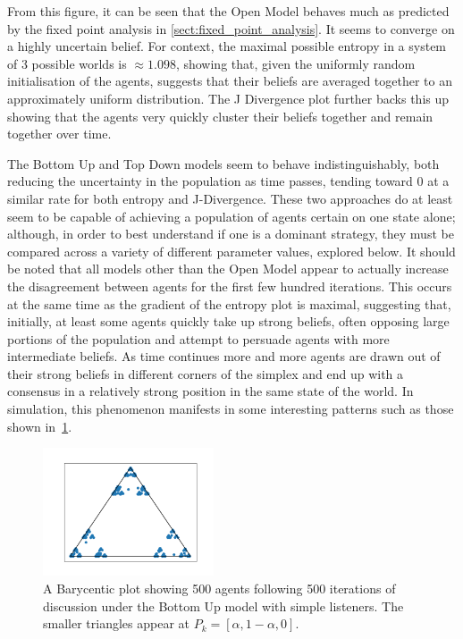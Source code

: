 From this figure, it can be seen that the Open Model behaves much as predicted by the fixed point analysis in \cref{sect:fixed_point_analysis}. It seems to converge on a highly uncertain belief. For context, the maximal possible entropy in a system of $3$ possible worlds is $\approx 1.098$, showing that, given the uniformly random initialisation of the agents, suggests that their beliefs are averaged together to an approximately uniform distribution. The J Divergence plot further backs this up showing that the agents very quickly cluster their beliefs together and remain together over time. 

The Bottom Up and Top Down models seem to behave indistinguishably, both reducing the uncertainty in the population as time passes, tending toward $0$ at a similar rate for both entropy and J-Divergence. These two approaches do at least seem to be capable of achieving a population of agents certain on one state alone; although, in order to best understand if one is a dominant strategy, they must be compared across a variety of different parameter values, explored below.  It should be noted that all models other than the Open Model appear to actually increase the disagreement between agents for the first few hundred iterations. This occurs at the same time as the gradient of the entropy plot is maximal, suggesting that, initially, at least some agents quickly take up strong beliefs, often opposing large portions of the population and attempt to persuade agents with more intermediate beliefs. As time continues more and more agents are drawn out of their strong beliefs in different corners of the simplex and end up with a consensus in a relatively strong position in the same state of the world. In simulation, this phenomenon manifests in some interesting patterns such as those shown in~\cref{fig:sierpinski_triangle_intro}.


\begin{figure}[H]
    \centering
    \includegraphics[width=0.45\textwidth]{Images/Figures/Barycenter/Serpinski_example.png}
    \caption{A Barycentic plot showing 500 agents following 500 iterations of discussion under the Bottom Up model with simple listeners. The smaller triangles appear at $P_{k} = [\alpha, 1-\alpha, 0]$. }
    \label{fig:sierpinski_triangle_intro}
\end{figure}

